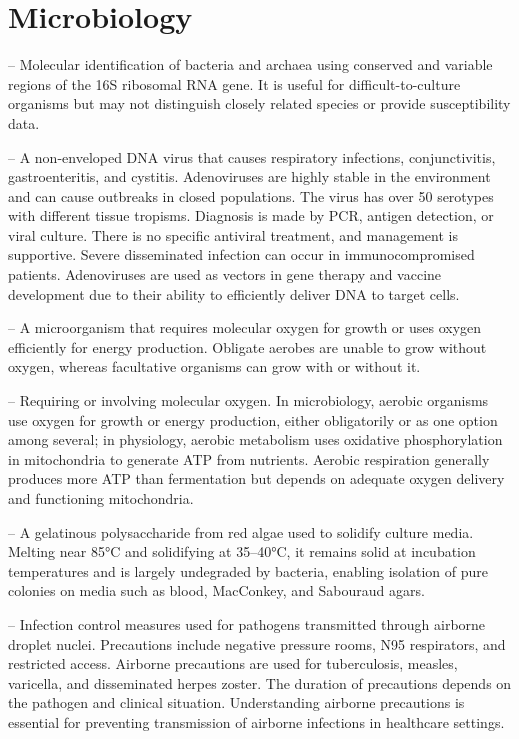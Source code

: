 \chapter{Microbiology}

-- Molecular identification of bacteria and archaea using conserved and variable regions of the 16S ribosomal RNA gene. It is useful for difficult-to-culture organisms but may not distinguish closely related species or provide susceptibility data.

-- A non-enveloped DNA virus that causes respiratory infections, conjunctivitis, gastroenteritis, and cystitis. Adenoviruses are highly stable in the environment and can cause outbreaks in closed populations. The virus has over 50 serotypes with different tissue tropisms. Diagnosis is made by PCR, antigen detection, or viral culture. There is no specific antiviral treatment, and management is supportive. Severe disseminated infection can occur in immunocompromised patients. Adenoviruses are used as vectors in gene therapy and vaccine development due to their ability to efficiently deliver DNA to target cells.

-- A microorganism that requires molecular oxygen for growth or uses oxygen efficiently for energy production. Obligate aerobes are unable to grow without oxygen, whereas facultative organisms can grow with or without it.

-- Requiring or involving molecular oxygen. In microbiology, aerobic organisms use oxygen for growth or energy production, either obligatorily or as one option among several; in physiology, aerobic metabolism uses oxidative phosphorylation in mitochondria to generate ATP from nutrients. Aerobic respiration generally produces more ATP than fermentation but depends on adequate oxygen delivery and functioning mitochondria.

-- A gelatinous polysaccharide from red algae used to solidify culture media. Melting near 85°C and solidifying at 35--40°C, it remains solid at incubation temperatures and is largely undegraded by bacteria, enabling isolation of pure colonies on media such as blood, MacConkey, and Sabouraud agars.

-- Infection control measures used for pathogens transmitted through airborne droplet nuclei. Precautions include negative pressure rooms, N95 respirators, and restricted access. Airborne precautions are used for tuberculosis, measles, varicella, and disseminated herpes zoster. The duration of precautions depends on the pathogen and clinical situation. Understanding airborne precautions is essential for preventing transmission of airborne infections in healthcare settings.

